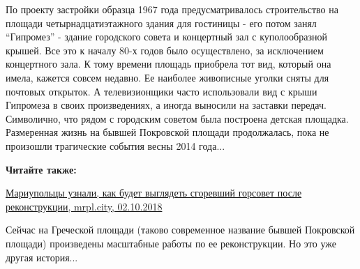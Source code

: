 

По проекту застройки образца 1967 года предусматривалось строительство на
площади  четырнадцатиэтажного здания для гостиницы - его потом занял \enquote{Гипромез}
- здание городского совета и концертный зал с куполообразной крышей. Все это к
началу 80-х годов было осуществлено, за исключением концертного зала. К тому
времени площадь приобрела тот вид, который она имела, кажется совсем недавно.
Ее наиболее живописные уголки сняты для почтовых открыток. А телевизионщики
часто использовали вид с крыши Гипромеза в своих произведениях, а иногда
выносили на заставки передач. Символично, что рядом с городским советом была
построена детская площадка. Размеренная жизнь на бывшей Покровской площади
продолжалась, пока не произошли трагические события весны 2014 года...

\textbf{Читайте также:} 

\href{https://mrpl.city/news/view/mariupoltsy-uznali-kak-budet-vyglyadet-sgorevshij-gorsovet-posle-rekonstruktsii-fotofakt}{Мариупольцы узнали, как будет выглядеть сгоревший горсовет после реконструкции, mrpl.city, 02.10.2018}

Сейчас на Греческой площади (таково современное название бывшей Покровской
площади) произведены масштабные работы по ее реконструкции. Но это уже другая
история...
